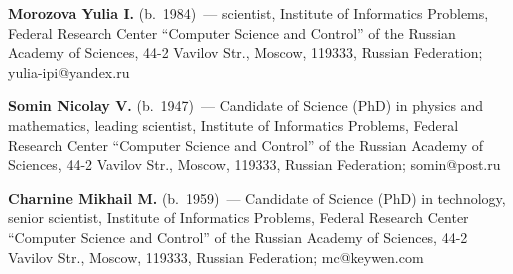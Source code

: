    \vspace*{3pt}

   \noindent
   \textbf{Morozova Yulia I.}  (b.\ 1984)~--- scientist, Institute of Informatics Problems,
Federal Research Center ``Computer Science and Control'' of the Russian Academy of Sciences,
44-2 Vavilov Str., Moscow, 119333, Russian Federation; yulia-ipi@yandex.ru

   \vspace*{3pt}

   \noindent
   \textbf{Somin Nicolay V.} (b.\ 1947)~---
   Candidate of Science (PhD) in physics and mathematics, leading scientist, Institute of
Informatics Problems, Federal Research Center ``Computer Science and Control'' of the Russian
Academy of Sciences, 44-2 Vavilov Str., Moscow, 119333, Russian Federation; somin@post.ru


\vspace*{3pt}

\noindent
\textbf{Charnine Mikhail M.} (b.\ 1959)~---  Candidate of Science (PhD) in
technology, senior scientist, Institute of Informatics Problems, Federal
Research Center ``Computer Science and Control'' of the Russian Academy of
Sciences, 44-2 Vavilov Str., Moscow, 119333, Russian Federation;
mc@keywen.com

\label{end\stat}


\renewcommand{\bibname}{\protect\rm Литература}

